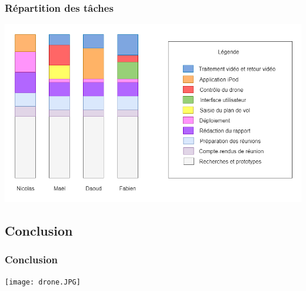\documentclass{beamer}
\begin{document}
	\begin{frame}
		\begin{center}
		\frametitle{Répartition des tâches}
        \includegraphics[scale=0.3]{repartition_taches.png}
		\end{center}
	\end{frame}

	
	\begin{frame}
	    \section{Conclusion}
		\begin{center}
		\frametitle{Conclusion}
		\texttt{[image: drone.JPG]}
		\end{center}
	\end{frame}



	
\end{document}
